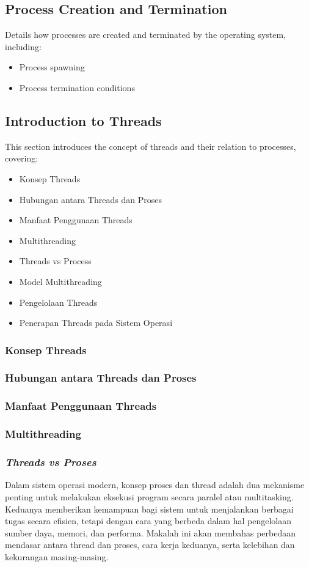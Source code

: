 \documentclass[12pt]{article}
\begin{document}
\subsection{Process Creation and Termination}
Details how processes are created and terminated by the operating system, including:
\begin{itemize}
    \item Process spawning
    \item Process termination conditions
\end{itemize}

\subsection{Introduction to Threads}
This section introduces the concept of threads and their relation to processes, covering:
\begin{itemize}
    \item Konsep Threads
    \item Hubungan antara Threads dan Proses
    \item Manfaat Penggunaan Threads
    \item Multithreading
    \item Threads vs Process
    \item Model Multithreading
    \item Pengelolaan Threads
    \item Penerapan Threads pada Sistem Operasi
\end{itemize}
\subsubsection{Konsep Threads}
\subsubsection{Hubungan antara Threads dan Proses}
\subsubsection{Manfaat Penggunaan Threads}
\subsubsection{Multithreading}
\subsubsection{\textit{Threads vs Proses}}
Dalam sistem operasi modern, konsep proses dan thread adalah dua mekanisme penting untuk melakukan eksekusi program secara paralel atau multitasking. Keduanya memberikan kemampuan bagi sistem untuk menjalankan berbagai tugas secara efisien, tetapi dengan cara yang berbeda dalam hal pengelolaan sumber daya, memori, dan performa. Makalah ini akan membahas perbedaan mendasar antara thread dan proses, cara kerja keduanya, serta kelebihan dan kekurangan masing-masing.
\end{document}
